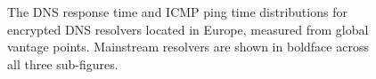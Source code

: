 \begin{figure}[t!]
\begin{minipage}{1.35\textwidth}
    \caption{The DNS response time and ICMP ping time distributions for
    encrypted DNS resolvers located in Europe, measured from global vantage points.
    Mainstream resolvers are shown in boldface across all three
    sub-figures.}
\label{fig:dns-europe}
\end{minipage}
\end{figure}



\begin{figure}[t!]
\hspace*{-1in}
\begin{minipage}{1.35\textwidth}
\hfill%
%
\hfill%
%

\end{minipage}
\end{figure}
